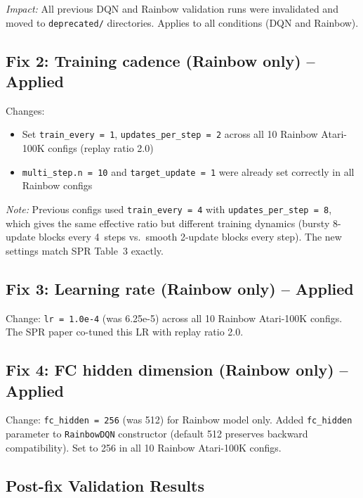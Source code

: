 \documentclass[11pt]{article}
\begin{document}
\noindent\textit{Impact:} All previous DQN and Rainbow validation
runs were invalidated and moved to \texttt{deprecated/} directories.
Applies to all conditions (DQN and Rainbow).

\subsection{Fix 2: Training cadence (Rainbow only) -- Applied}

\noindent Changes:
\begin{itemize}[leftmargin=2em, itemsep=0.1em]
  \item Set \texttt{train\_every = 1}, \texttt{updates\_per\_step = 2}
    across all 10 Rainbow Atari-100K configs (replay ratio 2.0)
  \item \texttt{multi\_step.n = 10} and \texttt{target\_update = 1}
    were already set correctly in all Rainbow configs
\end{itemize}

\noindent\textit{Note:} Previous configs used
\texttt{train\_every\,=\,4} with
\texttt{updates\_per\_step\,=\,8}, which gives the same effective
ratio but different training dynamics (bursty 8-update blocks every
4~steps vs.\ smooth 2-update blocks every step). The new settings
match SPR Table~3 exactly.

\subsection{Fix 3: Learning rate (Rainbow only) -- Applied}

\noindent Change: \texttt{lr = 1.0e-4} (was 6.25e-5) across all 10
Rainbow Atari-100K configs. The SPR paper co-tuned this LR with
replay ratio 2.0.

\subsection{Fix 4: FC hidden dimension (Rainbow only) -- Applied}

\noindent Change: \texttt{fc\_hidden = 256} (was 512) for Rainbow
model only. Added \texttt{fc\_hidden} parameter to
\texttt{RainbowDQN} constructor (default 512 preserves backward
compatibility). Set to 256 in all 10 Rainbow Atari-100K configs.

\subsection{Post-fix Validation Results}
\end{document}
